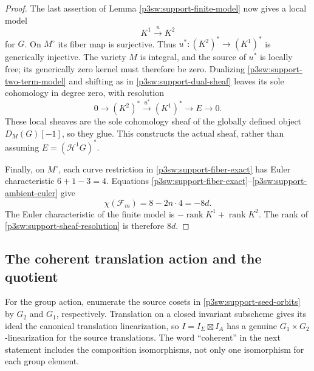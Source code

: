\documentclass[11pt]{article}
\numberwithin{equation}{section}
\begin{document}
\begin{proof}
The last assertion of Lemma \ref{p3sw:support-finite-model} now gives
a local model
\begin{equation}
 K^1\xrightarrow{u}K^2
 \label{p3sw:support-two-term-model}
\end{equation}
for \(G\).  On \(M^\circ\) its fiber map is surjective.  Thus
\(u^*:(K^2)^*\to(K^1)^*\) is generically injective.  The variety
\(M\) is integral, and the source of \(u^*\) is locally free; its
generically zero kernel must therefore be zero.  Dualizing \eqref{p3sw:support-two-term-model} and
shifting as in \eqref{p3sw:support-dual-sheaf} leaves its sole cohomology in degree zero, with
resolution
\begin{equation}
 0\longrightarrow(K^2)^*\xrightarrow{u^*}(K^1)^*
 \longrightarrow E\longrightarrow0.
 \label{p3sw:support-sheaf-resolution}
\end{equation}
These local sheaves are the sole cohomology sheaf of the globally
defined object \(D_M(G)[-1]\), so they glue.  This constructs the
actual sheaf, rather than assuming \(E=(\mathcal H^1G)^*\).

Finally, on \(M^\circ\), each curve restriction in \eqref{p3sw:support-fiber-exact} has Euler
characteristic \(6+1-3=4\).  Equations \eqref{p3sw:support-fiber-exact}--\eqref{p3sw:support-ambient-euler} give
\begin{equation}
 \chi(\mathscr F_m)=8-2n\cdot4=-8d.
 \label{p3sw:support-fiber-euler}
\end{equation}
The Euler characteristic of the finite model is
\(-\operatorname{rank}K^1+\operatorname{rank}K^2\).
The rank of \eqref{p3sw:support-sheaf-resolution} is therefore \(8d\).
\end{proof}

\subsection{The coherent translation action and the quotient}

For the group action, enumerate the source cosets in \eqref{p3sw:support-seed-orbits} by
\(G_2\) and \(G_1\), respectively.  Translation on a closed
invariant subscheme gives its ideal the canonical translation
linearization, so \(I=I_\Sigma\boxtimes I_A\) has a genuine
\(G_1\times G_2\)-linearization for the source translations.
The word ``coherent'' in the next statement includes the composition
isomorphisms, not only one isomorphism for each group element.
\end{document}

